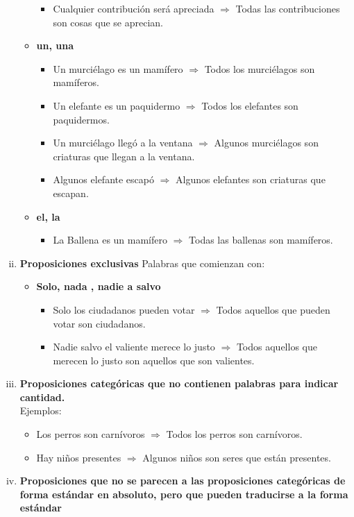 \documentclass[10pt]{book} 						%
\begin{document}
\begin{enumerate}[i)]
\begin{itemize}
\begin{itemize}
\item Cualquier contribución será apreciada $\Rightarrow$ Todas las contribuciones son cosas que se aprecian. 
\end{itemize}
\item \textbf{un, una}
\begin{itemize}
\item Un murciélago es un mamífero $\Rightarrow$ Todos los murciélagos son mamíferos. 
\item Un elefante es un paquidermo $\Rightarrow$ Todos los elefantes son paquidermos.
\item Un murciélago llegó a la ventana $\Rightarrow$ Algunos murciélagos son criaturas que llegan a la ventana. 
\item Algunos elefante escapó $\Rightarrow$ Algunos elefantes son criaturas que escapan.
\end{itemize}
\item \textbf{el, la}
\begin{itemize}
\item La Ballena es un mamífero $\Rightarrow$ Todas las ballenas son mamíferos. 
\end{itemize}
\end{itemize}
\item \textbf{Proposiciones exclusivas}
Palabras que comienzan con:
\begin{itemize}
\item \textbf{Solo, nada , nadie a salvo}
\begin{itemize}
\item Solo los ciudadanos pueden votar $\Rightarrow$ Todos aquellos que pueden votar son ciudadanos. 
\item Nadie salvo el valiente merece lo justo $\Rightarrow$ Todos aquellos que merecen lo justo son aquellos que son valientes. 
\end{itemize}
\end{itemize}
\item \textbf{Proposiciones categóricas que no contienen palabras para indicar cantidad.}\\
Ejemplos:
\begin{itemize}
\item Los perros son carnívoros $\Rightarrow$ Todos los perros son carnívoros.
\item Hay niños presentes $\Rightarrow$ Algunos niños son seres que están presentes.
\end{itemize}
\item \textbf{Proposiciones que no se parecen a las proposiciones categóricas de forma estándar en absoluto, pero que pueden traducirse a la forma estándar}\\

\end{enumerate}
\end{document}
